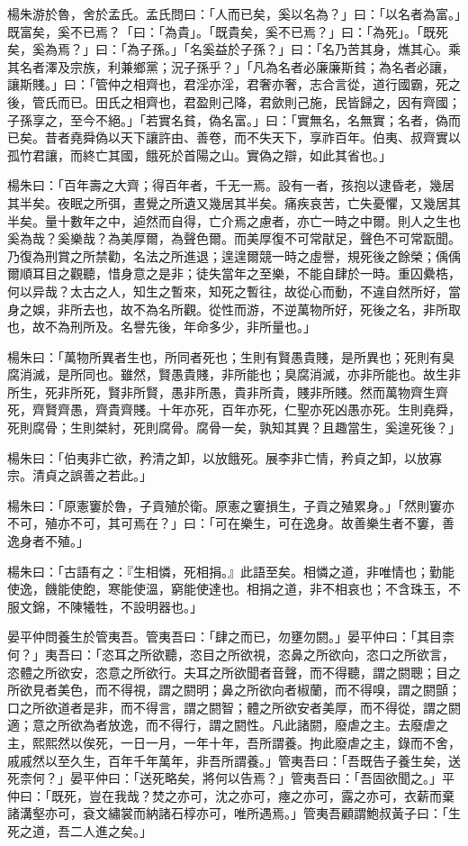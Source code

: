 
\begin{pinyinscope}
楊朱游於魯，舍於孟氏。孟氏問曰：「人而已矣，奚以名為？」曰：「以名者為富。」既富矣，奚不已焉？「曰：「為貴」。「既貴矣，奚不已焉？」曰：「為死」。「既死矣，奚為焉？」曰：「為子孫。」「名奚益於子孫？」曰：「名乃苦其身，燋其心。乘其名者澤及宗族，利兼鄉黨；況子孫乎？」「凡為名者必廉廉斯貧；為名者必讓，讓斯賤。」曰：「管仲之相齊也，君淫亦淫，君奢亦奢，志合言從，道行國霸，死之後，管氏而已。田氏之相齊也，君盈則己降，君歛則己施，民皆歸之，因有齊國；子孫享之，至今不絕。」「若實名貧，偽名富。」曰：「實無名，名無實；名者，偽而已矣。昔者堯舜偽以天下讓許由、善卷，而不失天下，享祚百年。伯夷、叔齊實以孤竹君讓，而終亡其國，餓死於首陽之山。實偽之辯，如此其省也。」

楊朱曰：「百年壽之大齊；得百年者，千无一焉。設有一者，孩抱以逮昏老，幾居其半矣。夜眠之所弭，晝覺之所遺又幾居其半矣。痛疾哀苦，亡失憂懼，又幾居其半矣。量十數年之中，逌然而自得，亡介焉之慮者，亦亡一時之中爾。則人之生也奚為哉？奚樂哉？為美厚爾，為聲色爾。而美厚復不可常猒足，聲色不可常翫聞。乃復為刑賞之所禁勸，名法之所進退；遑遑爾競一時之虛譽，規死後之餘榮；偊偊爾順耳目之觀聽，惜身意之是非；徒失當年之至樂，不能自肆於一時。重囚纍梏，何以异哉？太古之人，知生之暫來，知死之暫往，故從心而動，不違自然所好，當身之娛，非所去也，故不為名所觀。從性而游，不逆萬物所好，死後之名，非所取也，故不為刑所及。名譽先後，年命多少，非所量也。」

楊朱曰：「萬物所異者生也，所同者死也；生則有賢愚貴賤，是所異也；死則有臭腐消滅，是所同也。雖然，賢愚貴賤，非所能也；臭腐消滅，亦非所能也。故生非所生，死非所死，賢非所賢，愚非所愚，貴非所貴，賤非所賤。然而萬物齊生齊死，齊賢齊愚，齊貴齊賤。十年亦死，百年亦死，仁聖亦死凶愚亦死。生則堯舜，死則腐骨；生則桀紂，死則腐骨。腐骨一矣，孰知其異？且趣當生，奚遑死後？」

楊朱曰：「伯夷非亡欲，矜清之卸，以放餓死。展李非亡情，矜貞之卸，以放寡宗。清貞之誤善之若此。」

楊朱曰：「原憲窶於魯，子貢殖於衛。原憲之窶損生，子貢之殖累身。」「然則窶亦不可，殖亦不可，其可焉在？」曰：「可在樂生，可在逸身。故善樂生者不窶，善逸身者不殖。」

楊朱曰：「古語有之：『生相憐，死相捐。』此語至矣。相憐之道，非唯情也；勤能使逸，饑能使飽，寒能使溫，窮能使達也。相捐之道，非不相哀也；不含珠玉，不服文錦，不陳犧牲，不設明器也。」

晏平仲問養生於管夷吾。管夷吾曰：「肆之而已，勿壅勿閼。」晏平仲曰：「其目柰何？」夷吾曰：「恣耳之所欲聽，恣目之所欲視，恣鼻之所欲向，恣口之所欲言，恣體之所欲安，恣意之所欲行。夫耳之所欲聞者音聲，而不得聽，謂之閼聰；目之所欲見者美色，而不得視，謂之閼明；鼻之所欲向者椒蘭，而不得嗅，謂之閼顫；口之所欲道者是非，而不得言，謂之閼智；體之所欲安者美厚，而不得從，謂之閼適；意之所欲為者放逸，而不得行，謂之閼性。凡此諸閼，廢虐之主。去廢虐之主，熙熙然以俟死，一日一月，一年十年，吾所謂養。拘此廢虐之主，錄而不舍，戚戚然以至久生，百年千年萬年，非吾所謂養。」管夷吾曰：「吾既告子養生矣，送死柰何？」晏平仲曰：「送死略矣，將何以告焉？」管夷吾曰：「吾固欲聞之。」平仲曰：「既死，豈在我哉？焚之亦可，沈之亦可，瘞之亦可，露之亦可，衣薪而棄諸溝壑亦可，袞文繡裳而納諸石椁亦可，唯所遇焉。」管夷吾顧謂鮑叔黃子曰：「生死之道，吾二人進之矣。」


\end{pinyinscope}
